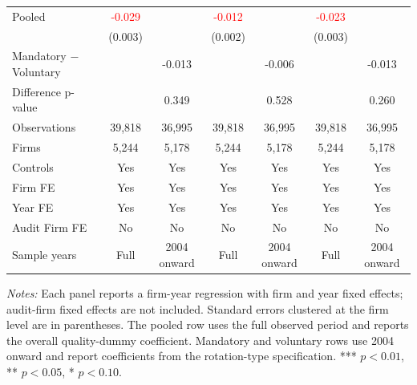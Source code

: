 \begin{table}[htbp]
\begin{threeparttable}
{\begin{tabular}{l cc cc cc}
Pooled & \textcolor{red}{-0.029\sym{***}} &  & \textcolor{red}{-0.012\sym{***}} &  & \textcolor{red}{-0.023\sym{***}} &  \\
 & (0.003) &  & (0.002) &  & (0.003) &  \\
Mandatory $-$ Voluntary &  & -0.013 &  & -0.006 &  & -0.013 \\
Difference p-value &  & 0.349 &  & 0.528 &  & 0.260 \\
Observations & 39,818 & 36,995 & 39,818 & 36,995 & 39,818 & 36,995 \\
Firms & 5,244 & 5,178 & 5,244 & 5,178 & 5,244 & 5,178 \\
\midrule
Controls & Yes & Yes & Yes & Yes & Yes & Yes \\
Firm FE & Yes & Yes & Yes & Yes & Yes & Yes \\
Year FE & Yes & Yes & Yes & Yes & Yes & Yes \\
Audit Firm FE & No & No & No & No & No & No \\
Sample years & Full & 2004 onward & Full & 2004 onward & Full & 2004 onward \\
\bottomrule
\end{tabular}}
\begin{tablenotes}\footnotesize
\item \textit{Notes:} Each panel reports a firm-year regression with firm and year fixed effects; audit-firm fixed effects are not included. Standard errors clustered at the firm level are in parentheses. The pooled row uses the full observed period and reports the overall quality-dummy coefficient. Mandatory and voluntary rows use 2004 onward and report coefficients from the rotation-type specification. *** \(p<0.01\), ** \(p<0.05\), * \(p<0.10\).
\end{tablenotes}
\end{threeparttable}
\end{table}
